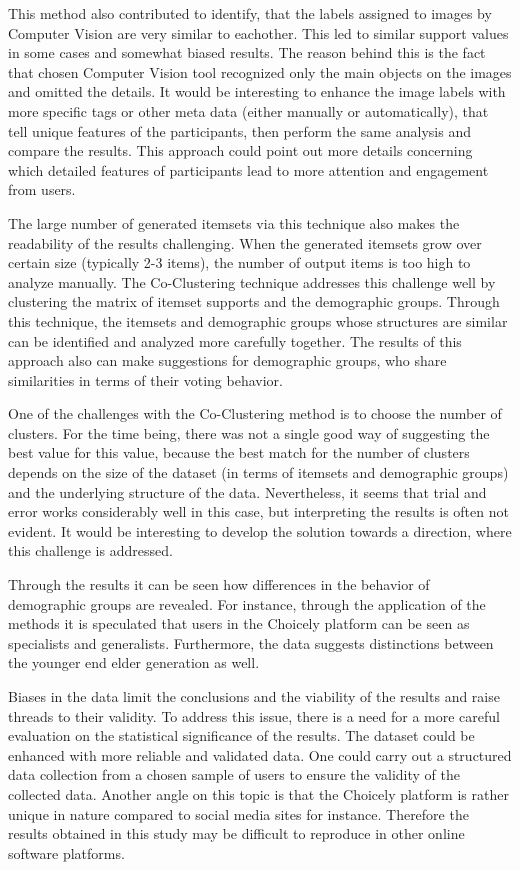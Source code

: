 This method also contributed to identify, that the labels assigned to images by Computer Vision are very similar to eachother. This led to similar support values in some cases and somewhat biased results. The reason behind this is the fact that chosen Computer Vision tool recognized only the main objects on the images and omitted the details. It would be interesting to enhance the image labels with more specific tags or other meta data (either manually or automatically), that tell unique features of the participants, then perform the same analysis and compare the results. This approach could point out more details concerning which detailed features of participants lead to more attention and engagement from users.

The large number of generated itemsets via this technique also makes the readability of the results challenging. When the generated itemsets grow over certain size (typically 2-3 items), the number of output items is too high to analyze manually. The Co-Clustering technique addresses this challenge well by clustering the matrix of itemset supports and the demographic groups. Through this technique, the itemsets and demographic groups whose structures are similar can be identified and analyzed more carefully together. The results of this approach also can make suggestions for demographic groups, who share similarities in terms of their voting behavior.

One of the challenges with the Co-Clustering method is to choose the number of clusters. For the time being, there was not a single good way of suggesting the best value for this value, because the best match for the number of clusters depends on the size of the dataset (in terms of itemsets and demographic groups) and the underlying structure of the data. Nevertheless, it seems that trial and error works considerably well in this case, but interpreting the results is often not evident. It would be interesting to develop the solution towards a direction, where this challenge is addressed.

Through the results it can be seen how differences in the behavior of demographic groups are revealed. For instance, through the application of the methods it is speculated that users in the Choicely platform can be seen as specialists and generalists. Furthermore, the data suggests distinctions between the younger end elder generation as well. 

Biases in the data limit the conclusions and the viability of the results and raise threads to their validity. To address this issue, there is a need for a more careful evaluation on the statistical significance of the results. The dataset could be enhanced with more reliable and validated data. One could carry out a structured data collection from a chosen sample of users to ensure the validity of the collected data. Another angle on this topic is that the Choicely platform is rather unique in nature compared to social media sites for instance. Therefore the results obtained in this study may be difficult to reproduce in other online software platforms.

